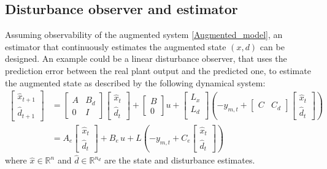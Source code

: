 \documentclass[a4paper,12pt,oneside]{book}
\begin{document}
\subsection*{Disturbance observer and estimator}
Assuming observability of the augmented system \eqref{Augmented_model}, an estimator that continuously estimates the augmented state $(x,d)$ can be designed.
An example could be a linear disturbance observer, that uses the prediction error between the real plant output and the predicted one, to estimate the augmented state as described by the following dynamical system:
\begin{equation}
    \begin{aligned}
    	\begin{bmatrix}
    	   \hat{x}_{t+1} \\
            \hat{d}_{t+1}
        \end{bmatrix}
        &= 
    	\begin{bmatrix}
    		A & B_d \\
    		0 & I
    	\end{bmatrix}
    	\begin{bmatrix}
    		\hat{x}_t \\
    		\hat{d}_t
    	\end{bmatrix}
        +
    	\begin{bmatrix}
    		B \\
    		0
    	\end{bmatrix}
        u +
        \begin{bmatrix}
            L_x \\
            L_d \\
        \end{bmatrix} 
        ( - y_{m,t} +
        \begin{bmatrix}
            C & C_d 
        \end{bmatrix}
        \begin{bmatrix}
            \hat{x}_t \\
            \hat{d}_t
        \end{bmatrix} ) \\
        & = A_e 
        \begin{bmatrix}
        \hat{x}_t \\
        \hat{d}_t
    	\end{bmatrix}
        + 
        B_e \, u +
        L (
         - y_{m,t} +
        C_e
        \begin{bmatrix}
            \hat{x}_t \\
            \hat{d}_t
        \end{bmatrix} )
    \end{aligned}
\label{eq:Estimator_and_observer}
\end{equation}
where $\hat{x} \in \mathbb{R}^n$ and $\hat{d} \in \mathbb{R}^{n_d}$ are the state and disturbance estimates.
\end{document}
